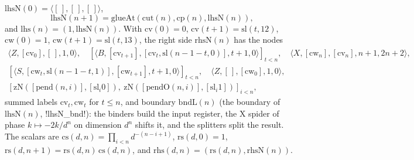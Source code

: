 {\begin{definition}\label{def:boxes-fca-sides}
$\mathrm{lhsN}(0)=\langle[\,],[\,],[\,]\rangle$,
\[
\mathrm{lhsN}(n+1)=\mathrm{glueAt}(\mathrm{cut}(n),\mathrm{cp}(n),\mathrm{lhsN}(n)),
\]
and $\mathrm{lhs}(n)=(1,\mathrm{lhsN}(n))$. With $\mathrm{cv}(0)=0$, $\mathrm{cv}(t+1)=\mathrm{sl}(t,12)$, $\mathrm{cw}(0)=1$, $\mathrm{cw}(t+1)=\mathrm{sl}(t,13)$, the right side $\mathrm{rhsN}(n)$ has the nodes
\begin{gather*}
\langle Z,[\mathrm{cv}_0],[\,],1,0\rangle,\quad [\langle B,[\mathrm{cv}_{t+1}],[\mathrm{cv}_t,\mathrm{sl}(n{-}1{-}t,0)],t+1,0\rangle]_{t<n},\quad \langle X,[\mathrm{cw}_n],[\mathrm{cv}_n],n+1,2n+2\rangle,\\
[\langle S,[\mathrm{cw}_t,\mathrm{sl}(n{-}1{-}t,1)],[\mathrm{cw}_{t+1}],t+1,0\rangle]_{t<n},\quad \langle Z,[\,],[\mathrm{cw}_0],1,0\rangle,\\
[\mathrm{zN}([\mathrm{pend}(n,i)],[\mathrm{sl}_i0]),\ \mathrm{zN}([\mathrm{pendO}(n,i)],[\mathrm{sl}_i1])]_{i<n},
\end{gather*}
summed labels $\mathrm{cv}_t,\mathrm{cw}_t$ for $t\le n$, and boundary $\mathrm{bndL}(n)$ (the boundary of $\mathrm{lhsN}(n)$, \lbx!lhsN_bnd!): the binders build the input register, the X spider of phase $k\mapsto -2k/d^n$ on dimension $d^n$ shifts it, and the splitters split the result. The scalars are $\mathrm{cs}(d,n)=\prod_{i<n}d^{-(n-i+1)}$, $\mathrm{rs}(d,0)=1$, $\mathrm{rs}(d,n+1)=\mathrm{rs}(d,n)\,\mathrm{cs}(d,n)$, and $\mathrm{rhs}(d,n)=(\mathrm{rs}(d,n),\mathrm{rhsN}(n))$.
\end{definition}

}
